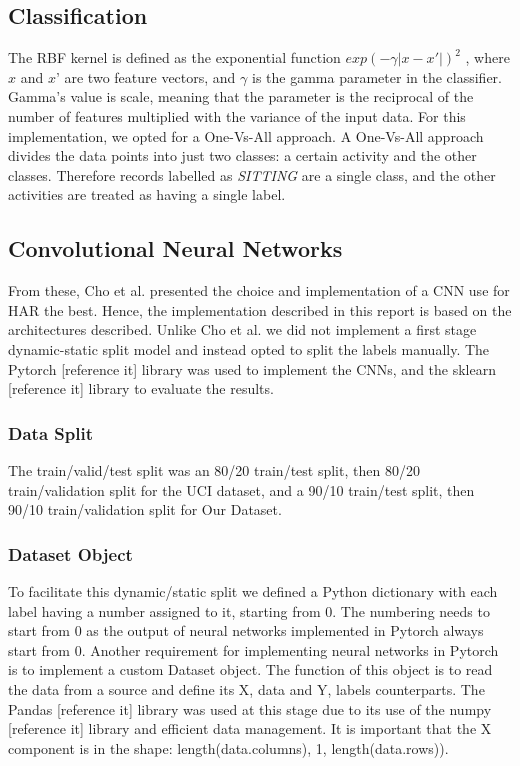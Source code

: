 \subsection{Classification}
    The RBF kernel is defined as the exponential function \(exp(-\gamma \lvert x-x' \rvert)^2\) \cite{Scholkopf2004}, where $x$ and $x’$ are two feature vectors, and $\gamma$ is the
    gamma parameter in the classifier. Gamma’s value is scale, meaning that the parameter is the reciprocal of the number of features multiplied with the variance of the input data.
    For this implementation, we opted for a One-Vs-All approach. A One-Vs-All approach divides the data points into just two classes: a certain activity and the other classes. Therefore records
    labelled as \emph{SITTING} are a single class, and the other activities are treated as having a single label.

\subsection{Convolutional Neural Networks}
From these, Cho et al. \cite{Cho2018} presented the choice and implementation of a CNN use for HAR the best.
Hence, the implementation described in this report is based on the architectures described.
Unlike Cho et al. we did not implement a first stage dynamic-static split model and instead opted to split the labels manually.
The Pytorch [reference it] library was used to implement the CNNs, and the sklearn [reference it] library to evaluate the results.

\subsubsection{Data Split}
The train/valid/test split was an 80/20 train/test split, then 80/20 train/validation split for the UCI dataset, and a 90/10 train/test split, then 90/10 train/validation split for Our Dataset.

\subsubsection{Dataset Object}
To facilitate this dynamic/static split we defined a Python dictionary with each label having a number assigned to it, starting from 0.
The numbering needs to start from 0 as the output of neural networks implemented in Pytorch always start from 0.
Another requirement for implementing neural networks in Pytorch is to implement a custom Dataset object.
The function of this object is to read the data from a source and define its X, data and Y, labels counterparts.
The Pandas [reference it] library was used at this stage due to its use of the numpy [reference it] library and efficient data management.
It is important that the X component is in the shape: length(data.columns), 1, length(data.rows)).

